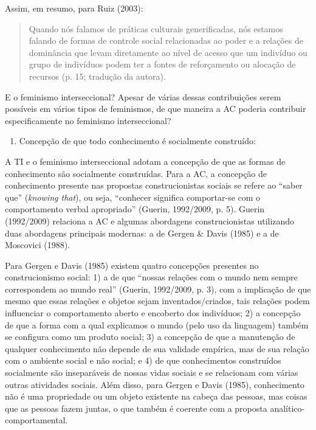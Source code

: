 Assim, em resumo, para Ruiz (2003):

\begin{quote}
    Quando nós falamos de práticas culturais generificadas, nós estamos falando de formas de controle social relacionadas ao poder e a relações de dominância que levam diretamente ao nível de acesso que um indivíduo ou grupo de indivíduos podem ter a fontes de reforçamento ou alocação de recursos (p. 15; tradução da autora).
\end{quote}
\vfill
\pagebreak
E o feminismo interseccional? Apesar de várias dessas contribuições serem possíveis em vários tipos de feminismos, de que maneira a AC poderia contribuir especificamente no feminismo interseccional?

\begin{enumerate}
    \item Concepção de que todo conhecimento é socialmente construído:
\end{enumerate}

A TI e o feminismo interseccional adotam a concepção de que as formas de conhecimento são socialmente construídas. Para a AC, a concepção de conhecimento presente nas propostas construcionistas sociais se refere ao ``saber que'' (\textit{knowing that}), ou seja, ``conhecer significa comportar-se com o comportamento verbal apropriado'' (Guerin, 1992/2009, p. 5). Guerin (1992/2009) relaciona a AC e algumas abordagens construcionistas utilizando duas abordagens principais modernas: a de Gergen \& Davis (1985) e a de Moscovici (1988).

Para Gergen e Davis (1985) existem quatro concepções presentes no construcionismo social: 1) a de que ``nossas relações com o mundo nem sempre correspondem ao mundo real'' (Guerin, 1992/2009, p. 3), com a implicação de que mesmo que essas relações e objetos sejam inventados/criados, tais relações podem influenciar o comportamento aberto e encoberto dos indivíduos; 2) a concepção de que a forma com a qual explicamos o mundo (pelo uso da linguagem) também se configura como um produto social; 3) a concepção de que a manutenção de qualquer conhecimento não depende de sua validade empírica, mas de sua relação com o ambiente social e não social; e 4) de que conhecimentos construídos socialmente são inseparáveis de nossas vidas sociais e se relacionam com várias outras atividades sociais. Além disso, para Gergen e Davis (1985), conhecimento não é uma propriedade ou um objeto existente na cabeça das pessoas, mas coisas que as pessoas fazem juntas, o que também é coerente com a proposta analítico-comportamental.

